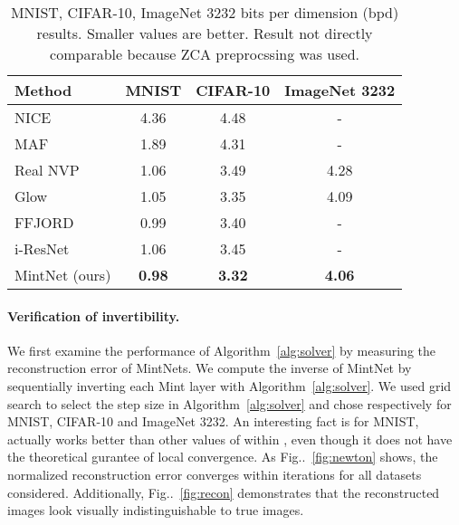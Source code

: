 \documentclass{article}
\makeatletter
\def\@onedot{\ifx\@let@token.\else.\null\fi\xspace}
\DeclareRobustCommand\onedot{\futurelet\@let@token\@onedot}
\newcommand{\figref}[1]{Fig\onedot~\ref{#1}}
\newcommand{\algoref}[1]{Algorithm~\ref{#1}}
\makeatother
\begin{document}
\begin{table}
 \caption{MNIST, CIFAR-10, ImageNet 3232 bits per dimension (bpd) results. Smaller values are better. Result not directly comparable because ZCA preprocssing was used.} \label{tab:bpd_table}
\begin{center}
    \begin{tabular}{p{5cm} c c c}
        \toprule
        Method & MNIST & CIFAR-10 & ImageNet 3232\\
        \midrule
        NICE~\cite{dinh2016density} &4.36 &4.48 & -\\
        MAF~\cite{maf} &1.89 &4.31 & -\\
        Real NVP~\cite{nvp} &1.06 &3.49 & 4.28\\
        Glow~\cite{glow} &1.05 &3.35 & 4.09\\
        FFJORD~\cite{FFJORD} &0.99 &3.40 & -\\
        i-ResNet~\cite{i-resnet} &1.06 &3.45 & - \\
        \midrule
        MintNet (ours) &\textbf{0.98} &\textbf{3.32} & \textbf{4.06}\\
        \bottomrule
    \end{tabular} 
\end{center}
\end{table}


\paragraph{Verification of invertibility.} We first examine the performance of \algoref{alg:solver} by measuring the reconstruction error of MintNets. We compute the inverse of MintNet by sequentially inverting each Mint layer with \algoref{alg:solver}. We used grid search to select the step size  in \algoref{alg:solver} and chose  respectively for MNIST, CIFAR-10 and ImageNet 3232. An interesting fact is for MNIST,  actually works better than other values of  within , even though it does not have the theoretical gurantee of local convergence. As \figref{fig:newton} shows, the normalized  reconstruction error converges within  iterations for all datasets considered. Additionally, \figref{fig:recon} demonstrates that the reconstructed images look visually indistinguishable to true images. 
\end{document}
